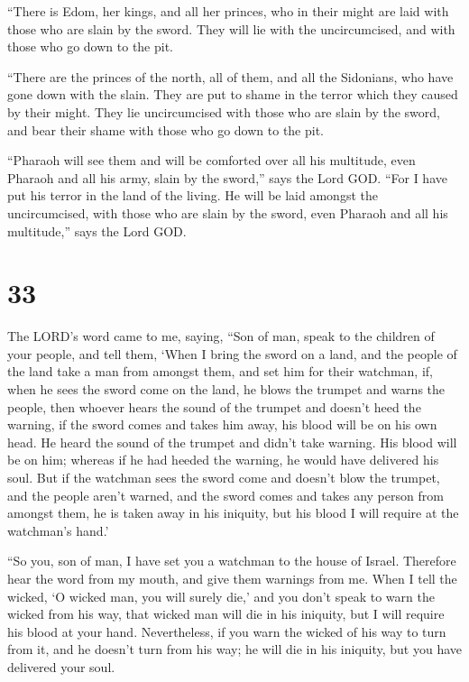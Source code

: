  ``There is Edom, her kings, and all her princes, who in
their might are laid with those who are slain by the sword. They will
lie with the uncircumcised, and with those who go down to the pit.

 ``There are the princes of the north, all of them, and all
the Sidonians, who have gone down with the slain. They are put to shame
in the terror which they caused by their might. They lie uncircumcised
with those who are slain by the sword, and bear their shame with those
who go down to the pit.

 ``Pharaoh will see them and will be comforted over all his
multitude, even Pharaoh and all his army, slain by the sword,'' says the
Lord GOD.  ``For I have put his terror in the land of the
living. He will be laid amongst the uncircumcised, with those who are
slain by the sword, even Pharaoh and all his multitude,'' says the Lord
GOD.

\hypertarget{section-31}{%
\section{33}\label{section-31}}

 The LORD's word came to me, saying,  ``Son of
man, speak to the children of your people, and tell them, `When I bring
the sword on a land, and the people of the land take a man from amongst
them, and set him for their watchman,  if, when he sees the
sword come on the land, he blows the trumpet and warns the people,
 then whoever hears the sound of the trumpet and doesn't
heed the warning, if the sword comes and takes him away, his blood will
be on his own head.  He heard the sound of the trumpet and
didn't take warning. His blood will be on him; whereas if he had heeded
the warning, he would have delivered his soul.  But if the
watchman sees the sword come and doesn't blow the trumpet, and the
people aren't warned, and the sword comes and takes any person from
amongst them, he is taken away in his iniquity, but his blood I will
require at the watchman's hand.'

 ``So you, son of man, I have set you a watchman to the
house of Israel. Therefore hear the word from my mouth, and give them
warnings from me.  When I tell the wicked, `O wicked man,
you will surely die,' and you don't speak to warn the wicked from his
way, that wicked man will die in his iniquity, but I will require his
blood at your hand.  Nevertheless, if you warn the wicked of
his way to turn from it, and he doesn't turn from his way; he will die
in his iniquity, but you have delivered your soul.


